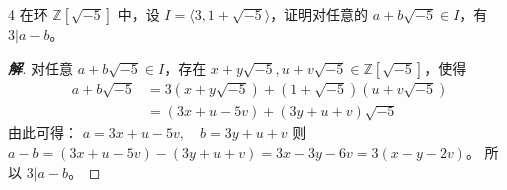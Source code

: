 \documentclass[12pt, a4paper]{article}
\newenvironment{solution}{
    \begin{proof}[\textbf{解}]
}{
    \end{proof}
}
\begin{document}
\begin{problem}{4}
    在环 $\mathbb{Z}[\sqrt{-5}]$ 中，设 $I = \langle 3, 1 + \sqrt{-5} \rangle$，证明对任意的 $a + b\sqrt{-5} \in I$，有 $3 | a - b$。
\end{problem}
\begin{solution}
    对任意 $a + b\sqrt{-5} \in I$，存在 $x + y\sqrt{-5}, u + v\sqrt{-5} \in \mathbb{Z}[\sqrt{-5}]$，使得
    \begin{align*}
        a + b\sqrt{-5} &= 3(x + y\sqrt{-5}) + (1 + \sqrt{-5})(u + v\sqrt{-5}) \\
        &= (3x + u - 5v) + (3y + u + v)\sqrt{-5}
    \end{align*}
    由此可得：
    $a = 3x + u - 5v, \quad b = 3y + u + v$
    则 $a - b = (3x + u - 5v) - (3y + u + v) = 3x - 3y - 6v = 3(x - y - 2v)$。
    所以 $3 | a - b$。
\end{solution}
\end{document}
